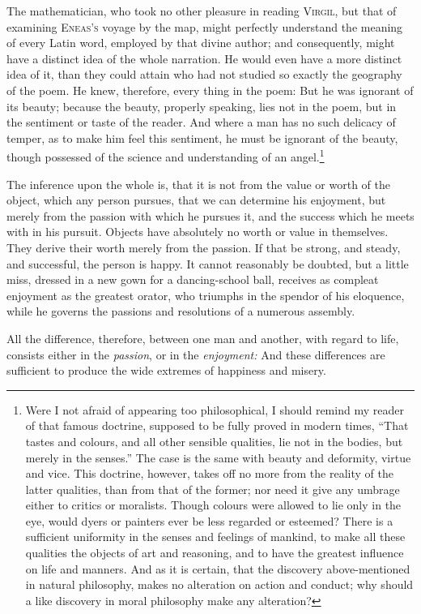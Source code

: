 The mathematician, who took no other pleasure in reading
\textsc{Virgil}, but that of examining \textsc{Eneas's} voyage by the
map, might perfectly understand the meaning of every Latin word,
employed by that divine author; and consequently, might have a
distinct idea of the whole narration. He would even have a more
distinct idea of it, than they could attain who had not studied so
exactly the geography of the poem. He knew, therefore, every thing in
the poem: But he was ignorant of its beauty; because the beauty,
properly speaking, lies not in the poem, but in the sentiment or taste
of the reader. And where a man has no such delicacy of temper, as to
make him feel this sentiment, he must be ignorant of the beauty,
though possessed of the science and understanding of an
angel.\footnote{Were I not afraid of appearing too philosophical, I
should remind my reader of that famous doctrine, supposed to be
fully proved in modern times, ``That tastes and colours, and all other
sensible qualities, lie not in the bodies, but merely in the senses.''
The case is the same with beauty and deformity, virtue and vice.
This doctrine, however, takes off no more from the reality of the
latter qualities, than from that of the former; nor need it give any
umbrage either to critics or moralists. Though colours were allowed to
lie only in the eye, would dyers or painters ever be less regarded
or esteemed? There is a sufficient uniformity in the senses and
feelings of mankind, to make all these qualities the objects of art
and reasoning, and to have the greatest influence on life and manners.
And as it is certain, that the discovery above-mentioned in natural
philosophy, makes no alteration on action and conduct; why should a
like discovery in moral philosophy make any alteration?}

The inference upon the whole is, that it is not from the value or
worth of the object, which any person pursues, that we can determine
his enjoyment, but merely from the passion with which he pursues it,
and the success which he meets with in his pursuit. Objects have
absolutely no worth or value in themselves. They derive their worth
merely from the passion. If that be strong, and steady, and
successful, the person is happy. It cannot reasonably be doubted, but
 a little miss, dressed in a new gown for a dancing-school
ball, receives as compleat enjoyment as the greatest orator, who
triumphs in the spendor of his eloquence, while he governs the
passions and resolutions of a numerous assembly.

All the difference, therefore, between one man and another, with
regard to life, consists either in the \textit{passion}, or in the
\textit{enjoyment:} And these differences are sufficient to produce
the wide extremes of happiness and misery.

